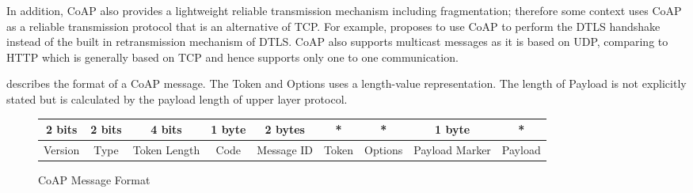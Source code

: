 In addition, CoAP also provides a lightweight reliable transmission mechanism including fragmentation\cite{CoapBlock}; therefore some context uses CoAP as a reliable transmission protocol that is an alternative of TCP. For example, \cite{CoDTLS} proposes to use CoAP to perform the DTLS handshake instead of the built in retransmission mechanism of DTLS. CoAP also supports multicast messages as it is based on UDP, comparing to HTTP which is generally based on TCP and  hence supports only one to one communication.

 describes the format of a CoAP message. The Token and Options uses a length-value representation. The length of Payload is not explicitly stated but is calculated by the payload length of upper layer protocol.
\begin{figure}[th!]
	\center
	\begin{tabular}{|c|c|c|c|c|c|c|c|c|}
	\hline
	2 bits  & 2 bits & 4 bits       & 1 byte & 2 bytes   & * & *       & 1 byte    & *       \\ \hline
	Version & Type   & Token Length & Code   & Message ID & Token                 & Options & Payload Marker & Payload \\ \hline
	\end{tabular}
	\caption{CoAP Message Format}
	\label{Fig: CoAP Message Format}
\end{figure}

